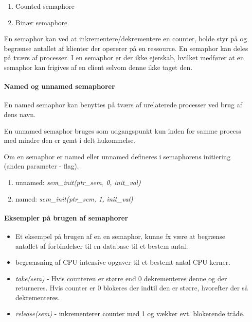 \begin{enumerate}
	\item Counted semaphore
	\item Binær semaphore
\end{enumerate}

En semaphor kan ved at inkrementere/dekrementere en counter, holde styr på og begrænse antallet af klienter der opererer på en ressource. En semaphor kan deles på tværs af processer. I en semaphor er der ikke ejerskab, hvilket medfører at en semaphor kan frigives af en client selvom denne ikke taget den.

\paragraph{Named og unnamed semaphorer}
En named semaphor kan benyttes på tværs af urelaterede processer ved brug af dens navn.

En unnamed semaphor bruges som udgangspunkt kun inden for samme process med mindre den er gemt i delt hukommelse. 

Om en semaphor er named eller unnamed defineres i semaphorens initiering (anden parameter - flag).

\begin{enumerate}
\item unnamed: \textit{sem\_init(ptr\_sem, 0, init\_val)}
\item named: \textit{sem\_init(ptr\_sem, 1, init\_val)}
\end{enumerate}

\paragraph{Eksempler på brugen af semaphorer}

\begin{itemize}
	\item Et eksempel på brugen af en en semaphor, kunne fx være at begrænse antallet af forbindelser til en database til et bestem antal.
	\item begrænsning af CPU intensive opgaver til et bestemt antal CPU kerner.
	\item \textit{take(sem)} - Hvis counteren er større end 0 dekrementeres denne og der returneres. Hvis counter er 0 blokeres der indtil den er større, hvorefter der så dekrementeres.
	\item \textit{release(sem)} - inkrementerer counter med 1 og vækker evt. blokerende tråde.
\end{itemize}

